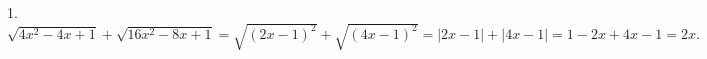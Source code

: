 1. $\sqrt{4x^2-4x+1}+\sqrt{16x^2-8x+1}=\sqrt{(2x-1)^2}+\sqrt{(4x-1)^2}=|2x-1|+|4x-1|=1-2x+4x-1=2x.$\\
